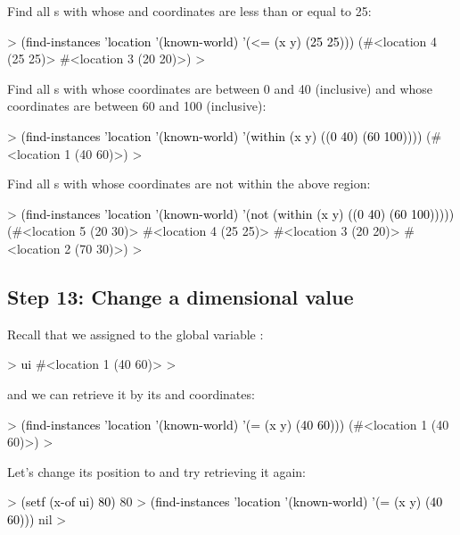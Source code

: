 \documentclass[10pt,twoside,english,pdftex]{article}
\begin{document}
Find all s with whose  and  coordinates
are less than or equal to 25:
%
\begin{example}\color{darkergray}%
  > \textcolor{black}{(find-instances 'location '(known-world)
      '(<= (x y) (25 25)))}
  (#<location 4 (25 25)> #<location 3 (20 20)>)
  >
\end{example}

Find all s with whose  coordinates are between 0 and 40
(inclusive) and whose  coordinates are between 60 and 100 (inclusive):
%
\begin{example}\color{darkergray}%
  > \textcolor{black}{(find-instances 'location '(known-world)
      '(within (x y) ((0 40) (60 100))))}
  (#<location 1 (40 60)>)
  >
\end{example}

Find all s with whose coordinates are not within the above
region:
%
\begin{example}\color{darkergray}%
  > \textcolor{black}{(find-instances 'location '(known-world)
      '(not (within (x y) ((0 40) (60 100)))))}
  (#<location 5 (20 30)> #<location 4 (25 25)> #<location 3 (20 20)>
   #<location 2 (70 30)>)
  >
\end{example}

\subsection*{Step 13: Change a dimensional value}

Recall that we assigned   to the global variable
:
%
\begin{example}\color{darkergray}%
  > \textcolor{black}{ui}
  #<location 1 (40 60)>
  >
\end{example}
  
%
and we can retrieve it by its  and  coordinates:
%
\begin{example}\color{darkergray}%
  > \textcolor{black}{(find-instances 'location '(known-world)
      '(= (x y) (40 60)))}
  (#<location 1 (40 60)>)
  >
\end{example}

%
Let's change its  position to  and try retrieving it again:
%
\begin{example}\color{darkergray}%
  > \textcolor{black}{(setf (x-of ui) 80)}
  80
  > \textcolor{black}{(find-instances 'location '(known-world)
      '(= (x y) (40 60)))}
  nil
  >
\end{example}
\end{document}
